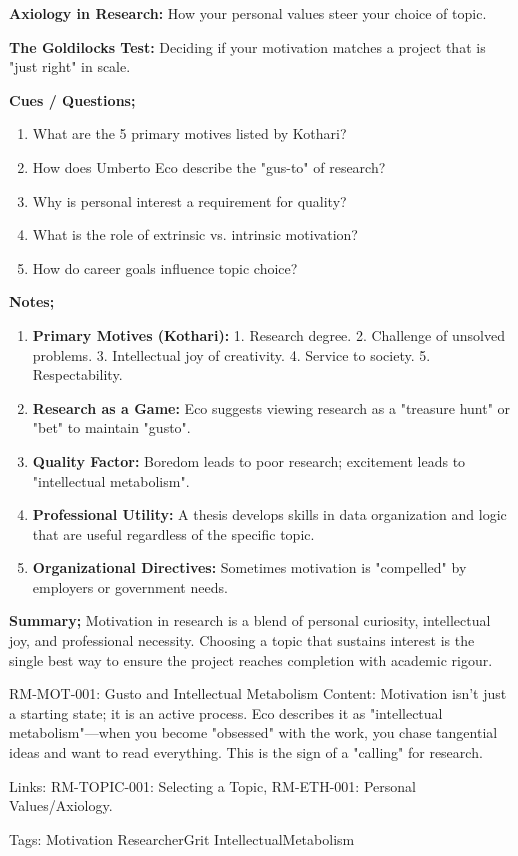\documentclass{report}
\begin{document}
\begin{optionalExplore}
    \textbf{Axiology in Research:} How your personal values steer your choice of topic.
    
    
    \textbf{The Goldilocks Test:} Deciding if your motivation matches a project that is "just right" in scale.
\end{optionalExplore}

\begin{cornellnotes}
    \textbf{Cues / Questions;}
    \begin{enumerate}
        \item What are the 5 primary motives listed by Kothari?
        \item How does Umberto Eco describe the "gus-to" of research?
        \item Why is personal interest a requirement for quality?
        \item What is the role of extrinsic vs. intrinsic motivation?
        \item How do career goals influence topic choice?
    \end{enumerate}
    \textbf{Notes;}
    \begin{enumerate}
        \item \textbf{Primary Motives (Kothari):} 1. Research degree. 2. Challenge of unsolved problems. 3. Intellectual joy of creativity. 4. Service to society. 5. Respectability.
        \item \textbf{Research as a Game:} Eco suggests viewing research as a "treasure hunt" or "bet" to maintain "gusto".
        \item \textbf{Quality Factor:} Boredom leads to poor research; excitement leads to "intellectual metabolism".
        \item \textbf{Professional Utility:} A thesis develops skills in data organization and logic that are useful regardless of the specific topic.
        \item \textbf{Organizational Directives:} Sometimes motivation is "compelled" by employers or government needs.
    \end{enumerate}
    \textbf{Summary;}
    Motivation in research is a blend of personal curiosity, intellectual joy, and professional necessity. Choosing a topic that sustains interest is the single best way to ensure the project reaches completion with academic rigour.
\end{cornellnotes}

\begin{zettelkasteinnotes}
    RM-MOT-001: Gusto and Intellectual Metabolism Content: Motivation isn't just a starting state; it is an active process. Eco describes it as "intellectual metabolism"—when you become "obsessed" with the work, you chase tangential ideas and want to read everything. This is the sign of a "calling" for research. 
    
    Links: RM-TOPIC-001: Selecting a Topic, RM-ETH-001: Personal Values/Axiology. 
    
    Tags: Motivation ResearcherGrit IntellectualMetabolism
\end{zettelkasteinnotes}
\end{document}
